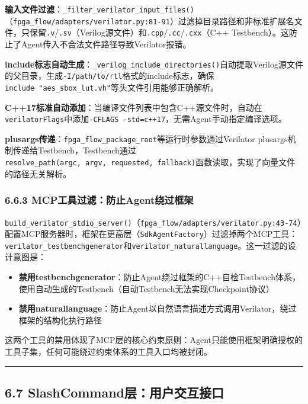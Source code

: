 \textbf{输入文件过滤}：\texttt{\_filter\_verilator\_input\_files()}（\texttt{fpga\_flow/adapters/verilator.py:81-91}）过滤掉目录路径和非标准扩展名文件，只保留\texttt{.v}/\texttt{.sv}（Verilog源文件）和\texttt{.cpp}/\texttt{.cc}/\texttt{.cxx}（C++
Testbench）。这防止了Agent传入不合法文件路径导致Verilator报错。

\textbf{include标志自动生成}：\texttt{\_verilog\_include\_directories()}自动提取Verilog源文件的父目录，生成\texttt{-I/path/to/rtl}格式的include标志，确保\texttt{\textasciigrave{}include\ "aes\_sbox\_lut.vh"}等头文件引用能够正确解析。

\textbf{C++17标准自动添加}：当编译文件列表中包含C++源文件时，自动在\texttt{verilatorFlags}中添加\texttt{-CFLAGS\ -std=c++17}，无需Agent手动指定编译选项。

\textbf{plusargs传递}：\texttt{fpga\_flow\_package\_root}等运行时参数通过Verilator
plusargs机制传递给Testbench，Testbench通过\texttt{resolve\_path(argc,\ argv,\ requested,\ fallback)}函数读取，实现了向量文件的路径无关解析。

\subsubsection{6.6.3
MCP工具过滤：防止Agent绕过框架}\label{mcpux5de5ux5177ux8fc7ux6ee4ux9632ux6b62agentux7ed5ux8fc7ux6846ux67b6}

\texttt{build\_verilator\_stdio\_server()}（\texttt{fpga\_flow/adapters/verilator.py:43-74}）配置MCP服务器时，框架在更高层（\texttt{SdkAgentFactory}）过滤掉两个MCP工具：\texttt{verilator\_testbenchgenerator}和\texttt{verilator\_naturallanguage}。这一过滤的设计意图是：

\begin{itemize}
\tightlist
\item
  \textbf{禁用testbenchgenerator}：防止Agent绕过框架的C++自检Testbench体系，使用自动生成的Testbench（自动Testbench无法实现Checkpoint协议）
\item
  \textbf{禁用naturallanguage}：防止Agent以自然语言描述方式调用Verilator，绕过框架的结构化执行路径
\end{itemize}

这两个工具的禁用体现了MCP层的核心约束原则：Agent只能使用框架明确授权的工具子集，任何可能绕过约束体系的工具入口均被封闭。

\begin{center}\rule{0.5\linewidth}{0.5pt}\end{center}

\subsection{6.7
SlashCommand层：用户交互接口}\label{slashcommandux5c42ux7528ux6237ux4ea4ux4e92ux63a5ux53e3}

